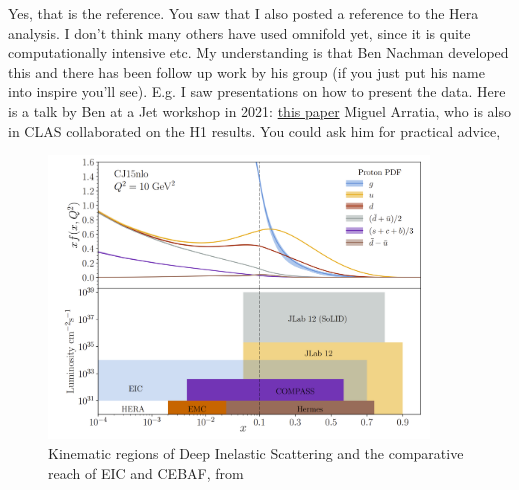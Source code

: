     
        Yes, that is the reference. You saw that I also posted a reference to the Hera analysis. I don’t think many others have used omnifold yet, since it is quite computationally intensive etc.
    My understanding is that Ben Nachman developed this and there has been follow up work by his group (if you just put his name into inspire you’ll see). E.g. I saw presentations on how to present the data. Here is a talk by Ben at a Jet workshop in 2021: \href{https://indico.bnl.gov/event/10555/contributions/54721/attachments/37368/61570/H1Measurement_EICWorkshopSeptember2021.pdf}{this paper}
     Miguel Arratia, who is also in CLAS collaborated on the H1 results. You could ask him for practical advice,
    
    
    \begin{figure}
        \centering
        \includegraphics[width=0.9\textwidth]{Chapters/Ch5-Further/X_conclusion/pics/future.png}
        \caption[Kinematic Overlap of Future Experiments]{Kinematic regions of Deep Inelastic Scattering and the comparative reach of EIC and CEBAF, from \parencite{Arrington2022PhysicsOpportunities} }
        \label{fig:physics_future_ranges}
    \end{figure}
    










